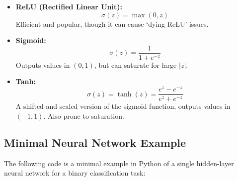 \begin{itemize}
    \item \textbf{ReLU (Rectified Linear Unit):} 
    \begin{equation}\label{eq:relu}
        \sigma(z) = \max(0, z)
    \end{equation}
    Efficient and popular, though it can cause `dying ReLU' issues.
    
    \item \textbf{Sigmoid:} 
    \begin{equation}\label{eq:sigmoid}
        \sigma(z) = \frac{1}{1+e^{-z}}
    \end{equation}
    Outputs values in $(0,1)$, but can saturate for large $|z|$.
    
    \item \textbf{Tanh:} 
    \begin{equation}\label{eq:tanh}
        \sigma(z) = \tanh(z) = \frac{e^z - e^{-z}}{e^z + e^{-z}}
    \end{equation}
    A shifted and scaled version of the sigmoid function, outputs values in $(-1, 1)$. Also prone to saturation.
\end{itemize}

\subsection{Minimal Neural Network Example}
\noindent
The following code is a minimal example in Python of a single hidden-layer neural network for a binary classification task:


